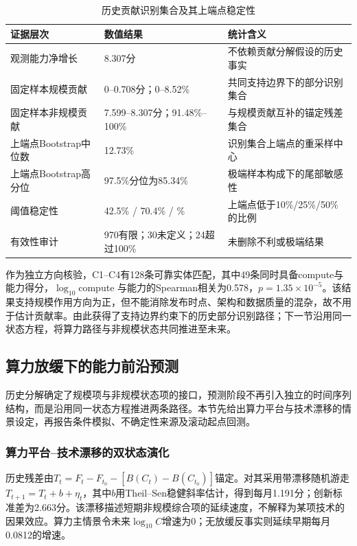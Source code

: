 \begin{table}[htbp]
\caption{历史贡献识别集合及其上端点稳定性}
\label{tab:q4-contribution-stability}
\CompactTableSetup
\begin{tabularx}{0.90\textwidth}{@{}L C{2.55cm}Y@{}}
\toprule
证据层次 & 数值结果 & 统计含义\\
\midrule
观测能力净增长 & 8.307分 & 不依赖贡献分解假设的历史事实\\
固定样本规模贡献 & 0--0.708分；0--8.52\% & 共同支持边界下的部分识别集合\\
固定样本非规模贡献 & 7.599--8.307分；91.48\%--100\% & 与规模贡献互补的锚定残差集合\\
上端点Bootstrap中位数 & 12.73\% & 识别集合上端点的重采样中心\\
上端点Bootstrap高分位 & 97.5\%分位为85.34\% & 极端样本构成下的尾部敏感性\\
阈值稳定性 & 42.5\% / 70.4\% / \% & 上端点低于10\%/25\%/50\%的比例\\
有效性审计 & 970有限；30未定义；24超过100\% & 未删除不利或极端结果\\
\bottomrule
\end{tabularx}
\end{table}

作为独立方向核验，C1--C4有128条可靠实体匹配，其中49条同时具备compute与能力得分，$\log_{10}$compute 与能力的Spearman相关为0.578，$p=1.35\times10^{-5}$。该结果支持规模作用方向为正，但不能消除发布时点、架构和数据质量的混杂，故不用于估计贡献率。由此获得了支持边界约束下的历史部分识别路径；下一节沿用同一状态方程，将算力路径与非规模状态共同推进至未来。

\subsection{算力放缓下的能力前沿预测}

历史分解确定了规模项与非规模状态项的接口，预测阶段不再引入独立的时间序列结构，而是沿用同一状态方程推进两条路径。本节先给出算力平台与技术漂移的情景设定，再报告条件模拟、不确定性来源及滚动起点回测。

\subsubsection{算力平台--技术漂移的双状态演化}

历史残差由$T_t=F_t-F_{t_0}-[B(C_t)-B(C_{t_0})]$锚定。对其采用带漂移随机游走$T_{t+1}=T_t+b+\eta_t$，其中$b$用Theil--Sen稳健斜率估计\cite{sen1968}，得到每月1.191分；创新标准差为2.663分。该漂移描述短期非规模综合项的延续速度，不解释为某项技术的因果效应。算力主情景令未来$\log_{10}C$增速为0；无放缓反事实则延续早期每月0.0812的增速。

